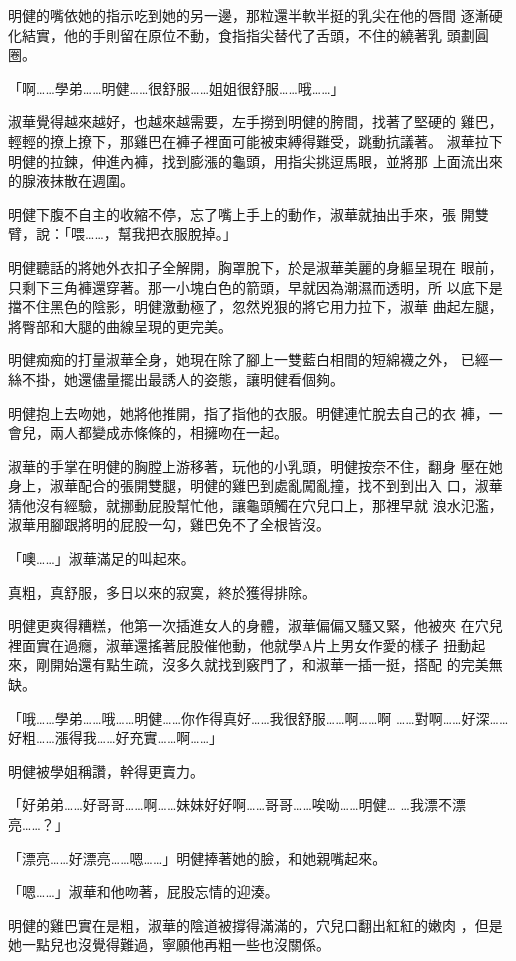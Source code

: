 明健的嘴依她的指示吃到她的另一邊，那粒還半軟半挺的乳尖在他的唇間
逐漸硬化結實，他的手則留在原位不動，食指指尖替代了舌頭，不住的繞著乳
頭劃圓圈。

「啊……學弟……明健……很舒服……姐姐很舒服……哦……」

淑華覺得越來越好，也越來越需要，左手撈到明健的胯間，找著了堅硬的
雞巴，輕輕的撩上撩下，那雞巴在褲子裡面可能被束縛得難受，跳動抗議著。
淑華拉下明健的拉鍊，伸進內褲，找到膨漲的龜頭，用指尖挑逗馬眼，並將那
上面流出來的腺液抹散在週圍。

明健下腹不自主的收縮不停，忘了嘴上手上的動作，淑華就抽出手來，張
開雙臂，說：「喂……，幫我把衣服脫掉。」

明健聽話的將她外衣扣子全解開，胸罩脫下，於是淑華美麗的身軀呈現在
眼前，只剩下三角褲還穿著。那一小塊白色的箭頭，早就因為潮濕而透明，所
以底下是擋不住黑色的陰影，明健激動極了，忽然兇狠的將它用力拉下，淑華
曲起左腿，將臀部和大腿的曲線呈現的更完美。

明健痴痴的打量淑華全身，她現在除了腳上一雙藍白相間的短綿襪之外，
已經一絲不掛，她還儘量擺出最誘人的姿態，讓明健看個夠。

明健抱上去吻她，她將他推開，指了指他的衣服。明健連忙脫去自己的衣
褲，一會兒，兩人都變成赤條條的，相擁吻在一起。

淑華的手掌在明健的胸膛上游移著，玩他的小乳頭，明健按奈不住，翻身
壓在她身上，淑華配合的張開雙腿，明健的雞巴到處亂闖亂撞，找不到到出入
口，淑華猜他沒有經驗，就挪動屁股幫忙他，讓龜頭觸在穴兒口上，那裡早就
浪水氾濫，淑華用腳跟將明的屁股一勾，雞巴免不了全根皆沒。

「噢……」淑華滿足的叫起來。

真粗，真舒服，多日以來的寂寞，終於獲得排除。

明健更爽得糟糕，他第一次插進女人的身體，淑華偏偏又騷又緊，他被夾
在穴兒裡面實在過癮，淑華還搖著屁股催他動，他就學A片上男女作愛的樣子
扭動起來，剛開始還有點生疏，沒多久就找到竅門了，和淑華一插一挺，搭配
的完美無缺。

「哦……學弟……哦……明健……你作得真好……我很舒服……啊……啊
……對啊……好深……好粗……漲得我……好充實……啊……」

明健被學姐稱讚，幹得更賣力。

「好弟弟……好哥哥……啊……妹妹好好啊……哥哥……唉呦……明健…
…我漂不漂亮……？」

「漂亮……好漂亮……嗯……」明健捧著她的臉，和她親嘴起來。

「嗯……」淑華和他吻著，屁股忘情的迎湊。

明健的雞巴實在是粗，淑華的陰道被撐得滿滿的，穴兒口翻出紅紅的嫩肉
，但是她一點兒也沒覺得難過，寧願他再粗一些也沒關係。

